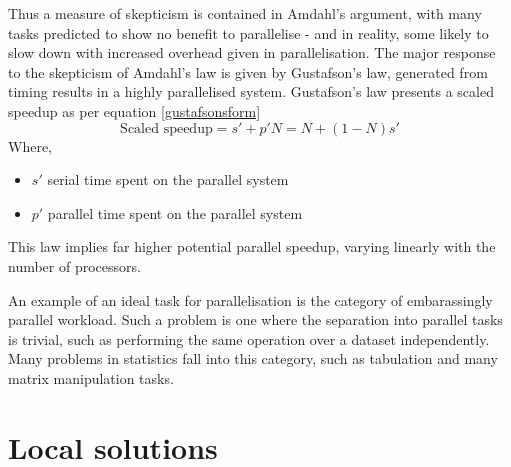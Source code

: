 \documentclass[a4paper,10pt]{article}
\begin{document}
Thus a measure of skepticism is contained in Amdahl's argument, with many tasks predicted to show no benefit to parallelise - and in reality, some likely to slow down with increased overhead given in parallelisation. 
The major response to the skepticism of Amdahl's law is given by Gustafson's law, generated from timing results in a highly parallelised system.
Gustafson's law presents a scaled speedup as per equation \ref{gustafsonsform}
\begin{equation}
	\label{gustafsonsform}
	\textrm{Scaled speedup} = s' + p'N = N + (1-N)s'
\end{equation}
Where,
\begin{itemize}
	\item \(s'\) serial time spent on the parallel system
	\item \(p'\) parallel time spent on the parallel system
\end{itemize}
This law implies far higher potential parallel speedup, varying linearly with the number of processors.

An example of an ideal task for parallelisation is the category of embarassingly parallel workload.
Such a problem is one where the separation into parallel tasks is trivial, such as performing the same operation over a dataset independently\cite{foster1995parallel}.
Many problems in statistics fall into this category, such as tabulation and many matrix manipulation tasks.

\section{Local solutions}
\label{local}
\end{document}
